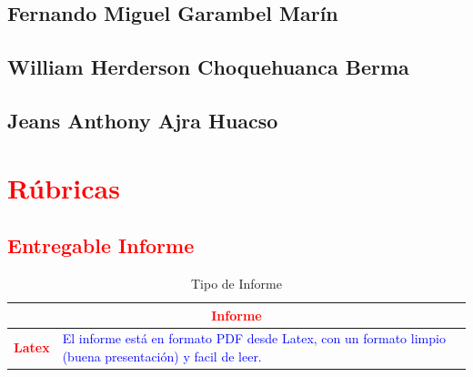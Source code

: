 \documentclass{article}
\begin{document}
	\subsection{Fernando Miguel Garambel Marín}
	\subsection{William Herderson Choquehuanca Berma}
	\subsection{Jeans Anthony Ajra Huacso}







\clearpage

	\section{\textcolor{red}{Rúbricas}}
	
	\subsection{\textcolor{red}{Entregable Informe}}
	\begin{table}[H]
		\caption{Tipo de Informe}
		\setlength{\tabcolsep}{0.5em} %
		{\renewcommand{\arraystretch}{1.5}%
		\begin{tabular}{|p{3cm}|p{12cm}|}
			\hline
			\multicolumn{2}{|c|}{\textbf{\textcolor{red}{Informe}}}  \\
			\hline 
			\textbf{\textcolor{red}{Latex}} & \textcolor{blue}{El informe está en formato PDF desde Latex,  con un formato limpio (buena presentación) y facil de leer.}   \\ 
			\hline 
			
			
		\end{tabular}
	}
	\end{table}
	
	\clearpage
	
\end{document}
